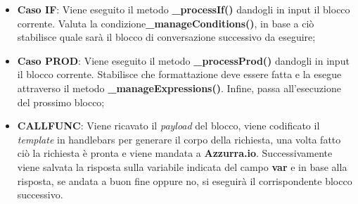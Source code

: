 \begin{enumerate}
\begin{itemize}
		\item \textbf{Caso IF}: Viene eseguito il metodo \textbf{\_processIf()} dandogli in input il blocco corrente. Valuta la condizione\textbf{\_manageConditions()}, in base a ciò stabilisce quale sarà il blocco di conversazione successivo da eseguire;
		\item \textbf{Caso PROD}: Viene eseguito il metodo \textbf{\_processProd()} dandogli in input il blocco corrente. Stabilisce che formattazione deve essere fatta e la esegue attraverso il metodo \textbf{\_manageExpressions()}. Infine, passa all'esecuzione del prossimo blocco;
		\item \textbf{CALLFUNC}: Viene ricavato il \emph{payload} del blocco, viene codificato il \emph{template} in handlebars per generare il corpo della richiesta, una volta fatto ciò la richiesta è pronta e viene mandata a \textbf{Azzurra.io}. Successivamente viene salvata la risposta sulla variabile indicata del campo \textbf{var} e in base alla risposta, se andata a buon fine oppure no, si eseguirà il corrispondente blocco successivo.
	\end{itemize}
	

\end{enumerate}

